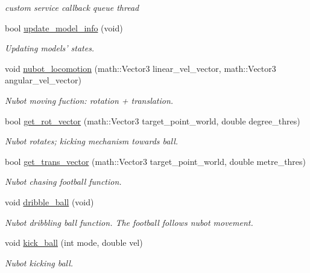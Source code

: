 \begin{DoxyCompactItemize}
\begin{DoxyCompactList}\small\item\em custom service callback queue thread \end{DoxyCompactList}\item 
bool \hyperlink{classgazebo_1_1NubotGazebo_a3b884175db3fd9e7ac88f6076d5f2b8e}{update\-\_\-model\-\_\-info} (void)
\begin{DoxyCompactList}\small\item\em Updating models' states. \end{DoxyCompactList}\item 
void \hyperlink{classgazebo_1_1NubotGazebo_ad93752507f23724bba2f731325e4c14b}{nubot\-\_\-locomotion} (math\-::\-Vector3 linear\-\_\-vel\-\_\-vector, math\-::\-Vector3 angular\-\_\-vel\-\_\-vector)
\begin{DoxyCompactList}\small\item\em Nubot moving fuction\-: rotation + translation. \end{DoxyCompactList}\item 
bool \hyperlink{classgazebo_1_1NubotGazebo_a8ac8c9467b8e14b4ceb0718d97031617}{get\-\_\-rot\-\_\-vector} (math\-::\-Vector3 target\-\_\-point\-\_\-world, double degree\-\_\-thres)
\begin{DoxyCompactList}\small\item\em Nubot rotates; kicking mechanism towards ball. \end{DoxyCompactList}\item 
bool \hyperlink{classgazebo_1_1NubotGazebo_a0a50fbb4be79c99cf860b84413f8fa9b}{get\-\_\-trans\-\_\-vector} (math\-::\-Vector3 target\-\_\-point\-\_\-world, double metre\-\_\-thres)
\begin{DoxyCompactList}\small\item\em Nubot chasing football function. \end{DoxyCompactList}\item 
void \hyperlink{classgazebo_1_1NubotGazebo_a91862269320f78bc24856e8877af3cc4}{dribble\-\_\-ball} (void)
\begin{DoxyCompactList}\small\item\em Nubot dribbling ball function. The football follows nubot movement. \end{DoxyCompactList}\item 
void \hyperlink{classgazebo_1_1NubotGazebo_a0b8f02255ccde5f6768afb45fee8b81b}{kick\-\_\-ball} (int mode, double vel)
\begin{DoxyCompactList}\small\item\em Nubot kicking ball. \end{DoxyCompactList}\item 

\end{DoxyCompactItemize}
